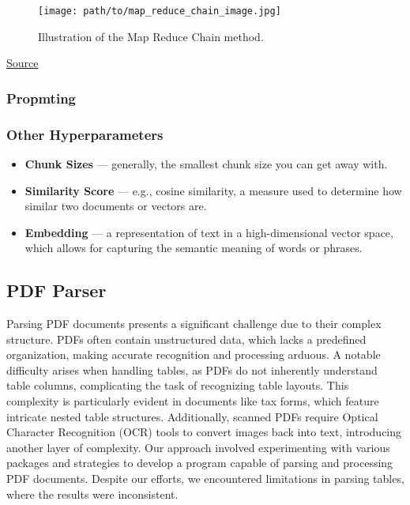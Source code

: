 \documentclass{scrartcl}
\begin{document}
\begin{figure}[H]
    \centering
    \texttt{[image: path/to/map\_reduce\_chain\_image.jpg]}
    \caption{Illustration of the Map Reduce Chain method.}
\end{figure}
\href{https://readmedium.com/en/https:/ogre51.medium.com/types-of-chains-in-langchain-823c8878c2e9}{Source}

\subsubsection{Propmting}

\subsubsection{Other Hyperparameters}
\begin{itemize}
    \item \textbf{Chunk Sizes} --- generally, the smallest chunk size you can get away with.
    \item \textbf{Similarity Score} --- e.g., cosine similarity, a measure used to determine how similar two documents or vectors are.
    \item \textbf{Embedding} --- a representation of text in a high-dimensional vector space, which allows for capturing the semantic meaning of words or phrases.
\end{itemize}

\subsection {PDF Parser}
Parsing PDF documents presents a significant challenge due to their complex structure. PDFs often contain unstructured data, which lacks a predefined organization, making accurate recognition and processing arduous. A notable difficulty arises when handling tables, as PDFs do not inherently understand table columns, complicating the task of recognizing table layouts. This complexity is particularly evident in documents like tax forms, which feature intricate nested table structures. Additionally, scanned PDFs require Optical Character Recognition (OCR) tools to convert images back into text, introducing another layer of complexity.
Our approach involved experimenting with various packages and strategies to develop a program capable of parsing and processing PDF documents. Despite our efforts, we encountered limitations in parsing tables, where the results were inconsistent.
\end{document}

